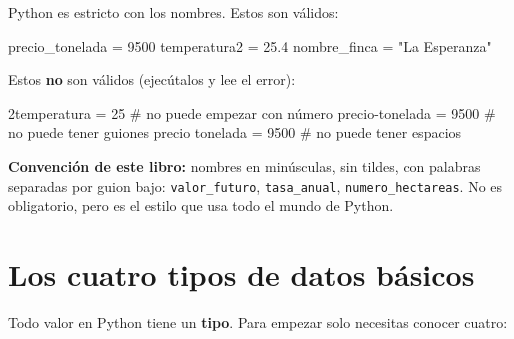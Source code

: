 \documentclass[
  spanish,
  letterpaper,
  DIV=11,
  numbers=noendperiod]{scrreprt}
\newenvironment{Shaded}{\begin{snugshade}}{\end{snugshade}}
\newcommand{\CommentTok}[1]{\textcolor[rgb]{0.37,0.37,0.37}{#1}}
\newcommand{\DecValTok}[1]{\textcolor[rgb]{0.68,0.00,0.00}{#1}}
\newcommand{\ErrorTok}[1]{\textcolor[rgb]{0.68,0.00,0.00}{#1}}
\newcommand{\FloatTok}[1]{\textcolor[rgb]{0.68,0.00,0.00}{#1}}
\newcommand{\NormalTok}[1]{\textcolor[rgb]{0.00,0.23,0.31}{#1}}
\newcommand{\OperatorTok}[1]{\textcolor[rgb]{0.37,0.37,0.37}{#1}}
\newcommand{\StringTok}[1]{\textcolor[rgb]{0.13,0.47,0.30}{#1}}
\begin{document}
Python es estricto con los nombres. Estos son válidos:

\begin{Shaded}
\begin{Highlighting}[]
\NormalTok{precio\_tonelada }\OperatorTok{=} \DecValTok{9500}
\NormalTok{temperatura2 }\OperatorTok{=} \FloatTok{25.4}
\NormalTok{nombre\_finca }\OperatorTok{=} \StringTok{"La Esperanza"}
\end{Highlighting}
\end{Shaded}

Estos \textbf{no} son válidos (ejecútalos y lee el error):

\begin{Shaded}
\begin{Highlighting}[]
\DecValTok{2}\ErrorTok{temperatura} \OperatorTok{=} \DecValTok{25}      \CommentTok{\# no puede empezar con número}
\NormalTok{precio}\OperatorTok{{-}}\NormalTok{tonelada }\OperatorTok{=} \DecValTok{9500} \CommentTok{\# no puede tener guiones}
\NormalTok{precio tonelada }\OperatorTok{=} \DecValTok{9500} \CommentTok{\# no puede tener espacios}
\end{Highlighting}
\end{Shaded}

\begin{tcolorbox}[enhanced jigsaw, arc=.35mm, bottomrule=.15mm, bottomtitle=1mm, breakable, colback=white, colbacktitle=quarto-callout-note-color!10!white, colframe=quarto-callout-note-color-frame, coltitle=black, left=2mm, leftrule=.75mm, opacityback=0, opacitybacktitle=0.6, rightrule=.15mm, title=\textcolor{quarto-callout-note-color}{\faInfo}\hspace{0.5em}{Nota}, titlerule=0mm, toprule=.15mm, toptitle=1mm]

\textbf{Convención de este libro:} nombres en minúsculas, sin tildes,
con palabras separadas por guion bajo: \texttt{valor\_futuro},
\texttt{tasa\_anual}, \texttt{numero\_hectareas}. No es obligatorio,
pero es el estilo que usa todo el mundo de Python.

\end{tcolorbox}

\section{Los cuatro tipos de datos
básicos}\label{los-cuatro-tipos-de-datos-buxe1sicos}

Todo valor en Python tiene un \textbf{tipo}. Para empezar solo necesitas
conocer cuatro:
\end{document}
